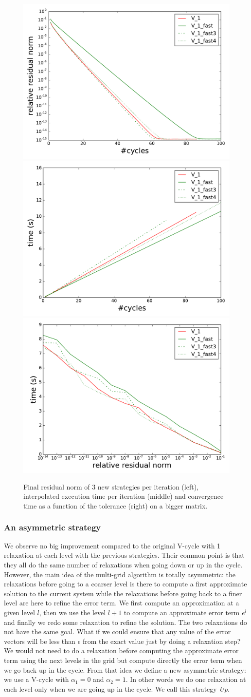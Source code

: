   \begin{figure}
  \includegraphics[width=0.33\linewidth]{figs/convergence_fast_norm.pdf}
  \includegraphics[width=0.33\linewidth]{figs/convergence_fast_time.pdf}
   \includegraphics[width=0.33\linewidth]{figs/time_convergence_fast.pdf}
  \caption{Final residual norm of 3 new strategies per iteration (left), interpolated execution time per iteration (middle) and convergence time as a function of the tolerance (right) on a bigger matrix.}
   \label{fig.newstrat}
  \end{figure}

\subsubsection{An asymmetric strategy}
\label{sec.assymetric}
  We observe no big improvement compared to the original V-cycle with 1 relaxation at each level with the previous strategies.
  Their common point is that they all do the same number of relaxations when going down or up in the cycle. However, the main idea of the multi-grid algorithm is totally asymmetric: the relaxations before
going to a coarser level is there to compute a first approximate solution to the current system while the relaxations before going back to a finer level are here to refine the error term.
  We first compute an approximation at a given level $l$, then we use the level $l+1$ to compute an approximate error term $e^l$ and finally we redo some relaxation to refine the solution. The two relaxations do not have the same goal.
  What if we could ensure that any value of the error vectors will be less than $\epsilon$ from the exact value just by doing a relaxation step? We would not need to do a relaxation
  before computing the approximate error term using the next levels in the grid but compute directly the error term when we go back up in the cycle. From that idea we define a new asymmetric strategy: we use a V-cycle with $\alpha_1 = 0$ and $\alpha_2 = 1$. In other words
  we do one relaxation at each level only when we are going up in the cycle. We call this strategy \emph{Up}.


